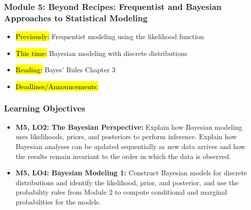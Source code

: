 
\begin{frame}
    \frametitle{Module 5: Beyond Recipes: Frequentist and Bayesian Approaches to Statistical Modeling}
    \begin{itemize}
        \item \hl{Previously: }Frequentist modeling using the likelihood function
        \item \hl{This time: }Bayesian modeling with discrete distributions
        \item \hl{Reading: }Bayes' Rules Chapter 3
        \item \hl{Deadlines/Announcements: }
    \end{itemize}

\end{frame}

\begin{frame}
    \frametitle{Learning Objectives}
    \begin{itemize}
        \item \textbf{M5, LO2: The Bayesian Perspective:} Explain how Bayesian modeling uses likelihoods, priors, and posteriors to perform inference. Explain how Bayesian analyses can be updated sequentially as new data arrives and how the results remain invariant to the order in which the data is observed.
        \item \textbf{M5, LO4: Bayesian Modeling 1:} Construct Bayesian models for discrete distributions and identify the likelihood, prior, and posterior, and use the probability rules from Module 2 to compute conditional and marginal probabilities for the models.
    \end{itemize}
\end{frame}
